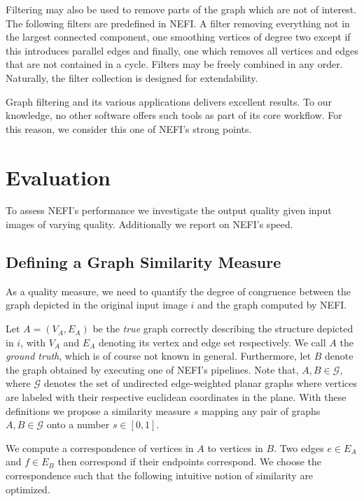 		Filtering may also be used to remove parts of the graph which are not of interest. The following filters are predefined in NEFI. A filter removing everything not in the largest connected component, one smoothing vertices of degree two except if this introduces parallel edges and finally, one which removes all vertices and edges that are not contained in a cycle. Filters may be freely combined in any order. Naturally, the filter collection is designed for extendability.

		Graph filtering and its various applications delivers excellent results. To our knowledge, no other software offers such tools as part of its core workflow. For this reason, we consider this one of NEFI's strong points.

\section*{Evaluation}

	To assess NEFI's performance we investigate the output quality given input images of varying quality. Additionally we report on NEFI's speed. 
 
	\subsection{Defining a Graph Similarity Measure}

		As a quality measure, we need to quantify the degree of congruence between the graph depicted in the original input image $i$ and the graph computed by NEFI.  

		Let $A = (V_A, E_A)$ be the \emph{true} graph correctly describing the structure depicted in $i$, with $V_A$ and $E_A$ denoting its vertex and edge set respectively. We call $A$ the \emph{ground truth}, which is of course not known in general. Furthermore, let $B$ denote the graph obtained by executing one of NEFI's pipelines. Note that, $A, B \in \mathcal{G}$, where $\mathcal{G}$ denotes the set of undirected edge-weighted planar graphs where vertices are labeled with their respective euclidean coordinates in the plane. With these definitions we propose a similarity measure $s$ mapping any pair of graphs $A,B \in \mathcal{G}$ onto a number $s \in [0,1]$. 

		We compute a correspondence of vertices in $A$ to vertices in $B$. Two edges $e \in E_A$ and $f \in E_B$ then correspond if their endpoints correspond. We choose the correspondence such that the following intuitive notion of similarity are optimized.

